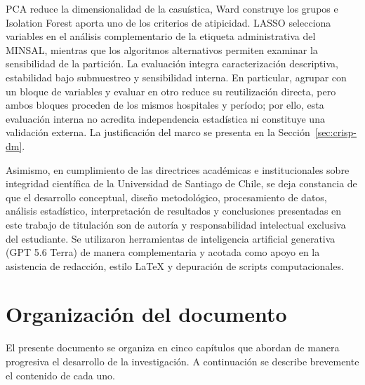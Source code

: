 PCA reduce la dimensionalidad de la casuística, Ward construye los grupos e
Isolation Forest aporta uno de los criterios de atipicidad. LASSO selecciona
variables en el análisis complementario de la etiqueta administrativa del
MINSAL, mientras que los algoritmos alternativos permiten examinar la
sensibilidad de la partición. La evaluación integra caracterización
descriptiva, estabilidad bajo submuestreo y sensibilidad interna. En
particular, agrupar con un bloque de variables y evaluar en otro reduce su
reutilización directa, pero ambos bloques proceden de los mismos hospitales y
período; por ello, esta evaluación interna no acredita independencia
estadística ni constituye una validación externa. La justificación del marco
se presenta en la Sección~\ref{sec:crisp-dm}.

Asimismo, en cumplimiento de las directrices académicas e institucionales sobre integridad científica de la Universidad de Santiago de Chile, se deja constancia de que el desarrollo conceptual, diseño metodológico, procesamiento de datos, análisis estadístico, interpretación de resultados y conclusiones presentadas en este trabajo de titulación son de autoría y responsabilidad intelectual exclusiva del estudiante. Se utilizaron herramientas de inteligencia artificial generativa (GPT 5.6 Terra) de manera complementaria y acotada como apoyo en la asistencia de redacción, estilo \LaTeX{} y depuración de scripts computacionales.

\section{Organización del documento}
\label{sec:organizacion}

El presente documento se organiza en cinco capítulos que abordan de manera
progresiva el desarrollo de la investigación. A continuación se describe
brevemente el contenido de cada uno.

